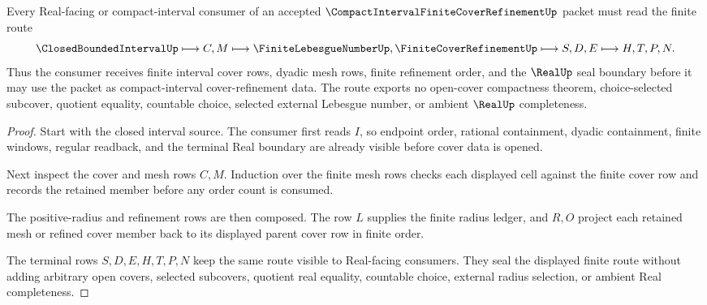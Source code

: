 \begin{theorem}
\label{thm:compact-interval-finite-cover-refinement-route}
Every Real-facing or compact-interval consumer of an accepted $\CompactIntervalFiniteCoverRefinementUp$ packet must read the finite route
$$
\ClosedBoundedIntervalUp \longmapsto C,M \longmapsto \FiniteLebesgueNumberUp,\FiniteCoverRefinementUp \longmapsto S,D,E \longmapsto H,T,P,N .
$$
Thus the consumer receives finite interval cover rows, dyadic mesh rows, finite refinement order, and the $\RealUp$ seal boundary before it may use the packet as compact-interval cover-refinement data. The route exports no open-cover compactness theorem, choice-selected subcover, quotient equality, countable choice, selected external Lebesgue number, or ambient $\RealUp$ completeness.
\end{theorem}
\begin{proof}
Start with the closed interval source. The consumer first reads $I$, so endpoint order, rational containment, dyadic containment, finite windows, regular readback, and the terminal Real boundary are already visible before cover data is opened.

Next inspect the cover and mesh rows $C,M$. Induction over the finite mesh rows checks each displayed cell against the finite cover row and records the retained member before any order count is consumed.

The positive-radius and refinement rows are then composed. The row $L$ supplies the finite radius ledger, and $R,O$ project each retained mesh or refined cover member back to its displayed parent cover row in finite order.

The terminal rows $S,D,E,H,T,P,N$ keep the same route visible to Real-facing consumers. They seal the displayed finite route without adding arbitrary open covers, selected subcovers, quotient real equality, countable choice, external radius selection, or ambient Real completeness.
\end{proof}


